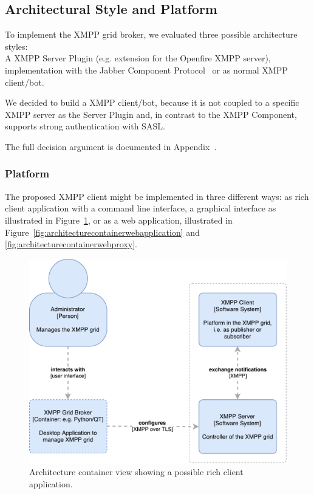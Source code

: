 \subsection{Architectural Style and Platform}

To implement the XMPP grid broker, we evaluated three possible architecture styles:\hfill\\
A XMPP Server Plugin (e.g. extension for the Openfire XMPP server), implementation with the Jabber Component Protocol~\cite{xep-0114} or as normal XMPP client/bot.

We decided to build a XMPP client/bot, because it is not coupled to a specific XMPP server as the Server Plugin and, in contrast to the XMPP Component, supports strong authentication with SASL.

The full decision argument is documented in Appendix~.

\subsubsection{Platform}

The proposed XMPP client might be implemented in three different ways: as rich client application with a command line interface, a graphical interface as illustrated in Figure~\ref{fig:architecturecontainerrichclient}, or as a web application, illustrated in Figure~\ref{fig:architecturecontainerwebapplication} and \ref{fig:architecturecontainerwebproxy}.

\begin{figure}[h]
\centering
\includegraphics[width=0.7\linewidth]{resources/architecture_container_rich_client}
\caption[Architecture Container Diagram Rich Client]{Architecture container view showing a possible rich client application.}
\label{fig:architecturecontainerrichclient}
\end{figure}

